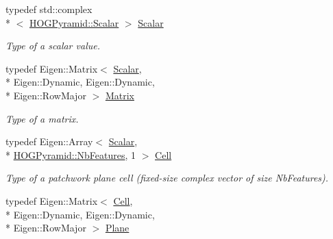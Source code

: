 \begin{DoxyCompactItemize}
\item 
\hypertarget{class_f_f_l_d_1_1_patchwork_aa1945335907399a846b7595f9215a2a3}{typedef std\-::complex\\*
$<$ \hyperlink{class_f_f_l_d_1_1_h_o_g_pyramid_af17c08ed86557e0a0aecb4814daf87c3}{H\-O\-G\-Pyramid\-::\-Scalar} $>$ \hyperlink{class_f_f_l_d_1_1_patchwork_aa1945335907399a846b7595f9215a2a3}{Scalar}}\label{class_f_f_l_d_1_1_patchwork_aa1945335907399a846b7595f9215a2a3}

\begin{DoxyCompactList}\small\item\em Type of a scalar value. \end{DoxyCompactList}\item 
\hypertarget{class_f_f_l_d_1_1_patchwork_ad50017d26020d6cc25061f62765eedf7}{typedef Eigen\-::\-Matrix$<$ \hyperlink{class_f_f_l_d_1_1_patchwork_aa1945335907399a846b7595f9215a2a3}{Scalar}, \\*
Eigen\-::\-Dynamic, Eigen\-::\-Dynamic, \\*
Eigen\-::\-Row\-Major $>$ \hyperlink{class_f_f_l_d_1_1_patchwork_ad50017d26020d6cc25061f62765eedf7}{Matrix}}\label{class_f_f_l_d_1_1_patchwork_ad50017d26020d6cc25061f62765eedf7}

\begin{DoxyCompactList}\small\item\em Type of a matrix. \end{DoxyCompactList}\item 
\hypertarget{class_f_f_l_d_1_1_patchwork_a2a631726c87e622e21c374c340b673cf}{typedef Eigen\-::\-Array$<$ \hyperlink{class_f_f_l_d_1_1_patchwork_aa1945335907399a846b7595f9215a2a3}{Scalar}, \\*
\hyperlink{class_f_f_l_d_1_1_h_o_g_pyramid_a418ebc8cf8781a3874f50b5eac482c68}{H\-O\-G\-Pyramid\-::\-Nb\-Features}, 1 $>$ \hyperlink{class_f_f_l_d_1_1_patchwork_a2a631726c87e622e21c374c340b673cf}{Cell}}\label{class_f_f_l_d_1_1_patchwork_a2a631726c87e622e21c374c340b673cf}

\begin{DoxyCompactList}\small\item\em Type of a patchwork plane cell (fixed-\/size complex vector of size Nb\-Features). \end{DoxyCompactList}\item 
\hypertarget{class_f_f_l_d_1_1_patchwork_a119551af7ed0303c3d6a0396ff4d3d39}{typedef Eigen\-::\-Matrix$<$ \hyperlink{class_f_f_l_d_1_1_patchwork_a2a631726c87e622e21c374c340b673cf}{Cell}, \\*
Eigen\-::\-Dynamic, Eigen\-::\-Dynamic, \\*
Eigen\-::\-Row\-Major $>$ \hyperlink{class_f_f_l_d_1_1_patchwork_a119551af7ed0303c3d6a0396ff4d3d39}{Plane}}\label{class_f_f_l_d_1_1_patchwork_a119551af7ed0303c3d6a0396ff4d3d39}


\end{DoxyCompactItemize}

